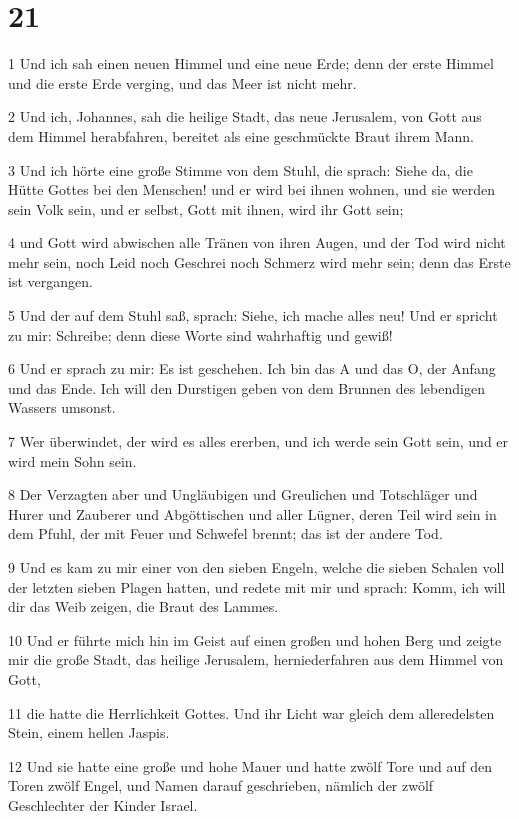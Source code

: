 \chapter{21}

\par 1 Und ich sah einen neuen Himmel und eine neue Erde; denn der erste Himmel und die erste Erde verging, und das Meer ist nicht mehr.
\par 2 Und ich, Johannes, sah die heilige Stadt, das neue Jerusalem, von Gott aus dem Himmel herabfahren, bereitet als eine geschmückte Braut ihrem Mann.
\par 3 Und ich hörte eine große Stimme von dem Stuhl, die sprach: Siehe da, die Hütte Gottes bei den Menschen! und er wird bei ihnen wohnen, und sie werden sein Volk sein, und er selbst, Gott mit ihnen, wird ihr Gott sein;
\par 4 und Gott wird abwischen alle Tränen von ihren Augen, und der Tod wird nicht mehr sein, noch Leid noch Geschrei noch Schmerz wird mehr sein; denn das Erste ist vergangen.
\par 5 Und der auf dem Stuhl saß, sprach: Siehe, ich mache alles neu! Und er spricht zu mir: Schreibe; denn diese Worte sind wahrhaftig und gewiß!
\par 6 Und er sprach zu mir: Es ist geschehen. Ich bin das A und das O, der Anfang und das Ende. Ich will den Durstigen geben von dem Brunnen des lebendigen Wassers umsonst.
\par 7 Wer überwindet, der wird es alles ererben, und ich werde sein Gott sein, und er wird mein Sohn sein.
\par 8 Der Verzagten aber und Ungläubigen und Greulichen und Totschläger und Hurer und Zauberer und Abgöttischen und aller Lügner, deren Teil wird sein in dem Pfuhl, der mit Feuer und Schwefel brennt; das ist der andere Tod.
\par 9 Und es kam zu mir einer von den sieben Engeln, welche die sieben Schalen voll der letzten sieben Plagen hatten, und redete mit mir und sprach: Komm, ich will dir das Weib zeigen, die Braut des Lammes.
\par 10 Und er führte mich hin im Geist auf einen großen und hohen Berg und zeigte mir die große Stadt, das heilige Jerusalem, herniederfahren aus dem Himmel von Gott,
\par 11 die hatte die Herrlichkeit Gottes. Und ihr Licht war gleich dem alleredelsten Stein, einem hellen Jaspis.
\par 12 Und sie hatte eine große und hohe Mauer und hatte zwölf Tore und auf den Toren zwölf Engel, und Namen darauf geschrieben, nämlich der zwölf Geschlechter der Kinder Israel.
